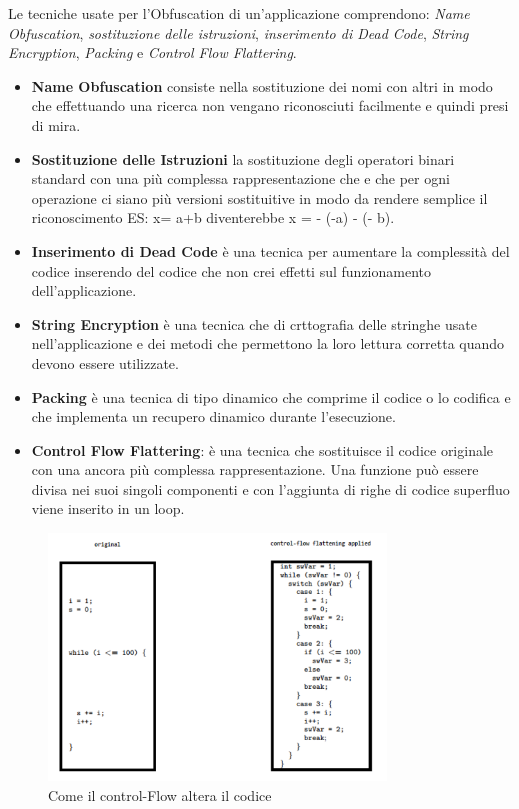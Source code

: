 \documentclass{article}
\begin{document}
Le tecniche usate per l'Obfuscation di un'applicazione comprendono: \textit{Name Obfuscation}, \textit{sostituzione delle istruzioni}, \textit{inserimento di Dead Code}, \textit{String Encryption},
\textit{Packing} e \textit{Control Flow Flattering}.
\begin{itemize}
    \item \textbf{Name Obfuscation} consiste nella sostituzione dei nomi con altri in modo che effettuando una ricerca non vengano riconosciuti facilmente e quindi presi di mira.
    \item \textbf{Sostituzione delle Istruzioni} la sostituzione degli operatori binari standard con una più complessa 
rappresentazione che e che per ogni operazione ci siano più versioni sostituitive in modo da rendere semplice il riconoscimento ES: x= a+b diventerebbe x = - (-a) - (- b).
    \item \textbf{Inserimento di Dead Code} è una tecnica per aumentare la complessità del codice inserendo del codice che non crei effetti sul funzionamento dell'applicazione. 
    \item \textbf{String Encryption} è una tecnica che di crttografia delle stringhe usate nell'applicazione e dei metodi che permettono la loro lettura corretta quando devono essere utilizzate. 
    \item \textbf{Packing} è una tecnica di tipo dinamico che comprime il codice o lo codifica e che implementa un recupero dinamico durante l'esecuzione. 
    \item \textbf{Control Flow Flattering}: è una tecnica che sostituisce il codice originale con una ancora più complessa rappresentazione. Una funzione può essere divisa nei 
    suoi singoli componenti e con l'aggiunta di righe di codice superfluo viene inserito in un loop.
\end{itemize}
\begin{figure}[htp]
    \centering
    \includegraphics[width=0.8\textwidth]{./controlFlow.png}
    \captionsetup{labelformat=empty}
    \caption{Come il control-Flow altera il codice}
    \label{fig:cFlow}
\end{figure}
\end{document}
